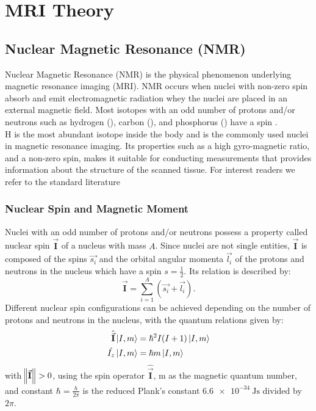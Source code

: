 \chapter{MRI Theory}\label{ch:theory}

\section{Nuclear Magnetic Resonance (NMR)}
Nuclear Magnetic Resonance (NMR) is the physical phenomenon underlying magnetic resonance imaging (MRI). NMR occurs when nuclei with non-zero spin absorb and emit electromagnetic radiation whey the nuclei are placed in an external magnetic field. Most isotopes with an odd number of protons and/or neutrons such as hydrogen (), carbon (), and phosphorus () have a spin \cite{12Sandy}.\\

\isotope[1]H is the most abundant isotope inside the body and is the commonly used nuclei in magnetic resonance imaging. Its properties such as a high gyro-magnetic ratio, and a non-zero spin, makes it suitable for conducting measurements that provides information about the structure of the scanned tissue. For interest readers we refer to the standard literature \cite{4and5Julio}\\

\subsection{Nuclear Spin and Magnetic Moment}
Nuclei with an odd number of protons and/or neutrons possess a property called nuclear spin $\mathbf{\vec{I}}$ of a nucleus with mass \(A\). Since nuclei are not single entities, \(\mathbf{\vec{I}}\) is composed of the spins $\vec{s_i}$ and the orbital angular momenta $\vec{l_i}$ of the protons and neutrons in the nucleus which have a spin $s=\frac{1}{2}$. Its relation is described by:
\begin{equation}\label{eq:nuclearSpin}
\mathbf{\vec{I}} = \sum_{i=1}^{A}\left(\vec{s_i} + \vec{l_i}\right).
\end{equation}
Different nuclear spin configurations can be achieved depending on the number of protons and neutrons in the nucleus, with the quantum relations given by:
\begin{align}
\hat{\vec{\mathbf{I}}}\ket{I,m} &= \hbar^2I(I+1)\ket{I,m}\\
\hat{I_z}\ket{I,m} &= \hbar m \ket{I,m}
\end{align} 
with $\norm{\vec{\mathbf{I}}} > 0$, using the spin operator $\hat{\vec{\mathbf{I}}}$, m as the magnetic quantum number, and constant $\hbar = \frac{h}{2\pi}$ is the reduced Plank's constant $\SI{6.6e-34}{\joule\second}$ divided by $2\pi$.\\

